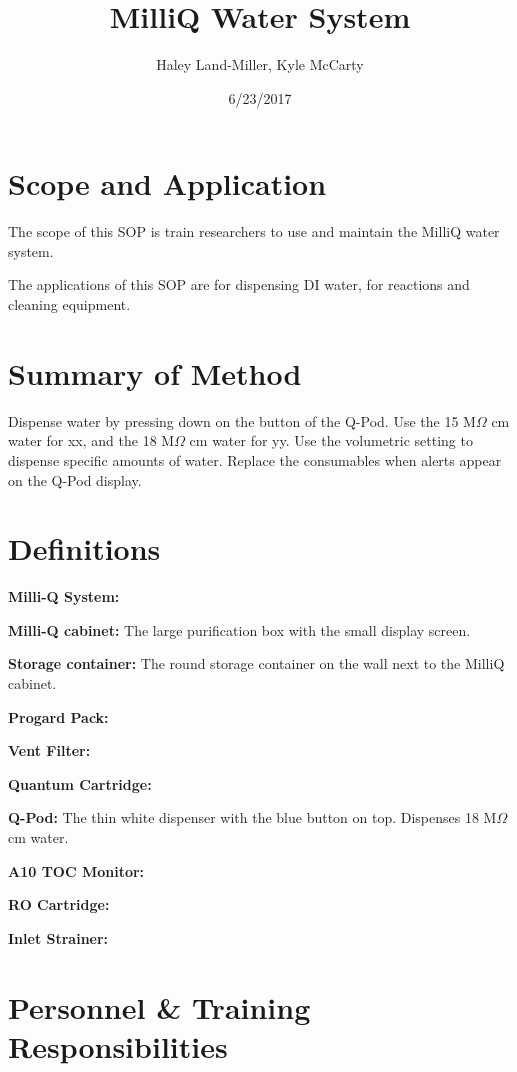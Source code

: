 \documentclass[12pt]{../SOP3_beta}\usepackage[]{graphicx}\usepackage[]{xcolor}
\title{MilliQ Water System}
\date{6/23/2017}
\author{Haley Land-Miller, Kyle McCarty}
\begin{document}
\maketitle

\section{Scope and Application}

\NP The scope of this SOP is train researchers to use and maintain the MilliQ water system.

\NP The applications of this SOP are for dispensing DI water, for reactions and cleaning equipment. 

\section{Summary of Method}

\NP Dispense water by pressing down on the button of the Q-Pod. Use the 15 M$\Omega$ cm water for xx, and the 18 M$\Omega$ cm water for yy. Use the volumetric setting to dispense specific amounts of water. Replace the consumables when alerts appear on the Q-Pod display. 

\tableofcontents

\newpage

\section{Definitions}

\NP \textbf{Milli-Q System:}

\NP \textbf{Milli-Q cabinet:} The large purification box with the small display screen.

\NP \textbf{Storage container:} The round storage container on the wall next to the MilliQ cabinet.

\NP \textbf{Progard Pack:}

\NP \textbf{Vent Filter:}

\NP \textbf{Quantum Cartridge:}

\NP \textbf{Q-Pod:} The thin white dispenser with the blue button on top. Dispenses 18 M$\Omega$ cm water.

\NP \textbf{A10 TOC Monitor:}

\NP \textbf{RO Cartridge:}

\NP \textbf{Inlet Strainer:}

\section{Personnel \& Training Responsibilities}
\end{document}
